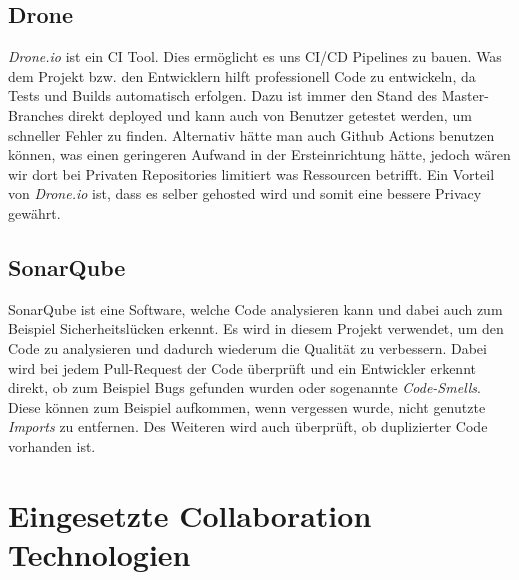 \subsection{Drone}
    \textit{Drone.io} ist ein \ac{CI} Tool. Dies ermöglicht es uns \ac{CI/CD} Pipelines zu bauen. Was dem Projekt bzw. den Entwicklern hilft professionell Code zu entwickeln, da Tests und Builds automatisch erfolgen.
    Dazu ist immer den Stand des Master-Branches direkt deployed und kann auch von Benutzer getestet werden, um schneller Fehler zu finden. Alternativ hätte man auch Github Actions benutzen können, was einen geringeren
    Aufwand in der Ersteinrichtung hätte, jedoch wären wir dort bei Privaten Repositories limitiert was Ressourcen betrifft. Ein Vorteil von \textit{Drone.io} ist, dass es selber gehosted wird und somit eine bessere Privacy gewährt.
\subsection{SonarQube}
    SonarQube ist eine Software, welche Code analysieren kann und dabei auch zum Beispiel Sicherheitslücken erkennt.
    Es wird in diesem Projekt verwendet, um den Code zu analysieren und dadurch wiederum die Qualität zu verbessern.
    Dabei wird bei jedem Pull-Request der Code überprüft und ein Entwickler erkennt direkt, ob zum Beispiel Bugs gefunden wurden oder sogenannte \textit{Code-Smells}. 
    Diese können zum Beispiel aufkommen, wenn vergessen wurde, nicht genutzte \textit{Imports} zu entfernen.
    Des Weiteren wird auch überprüft, ob duplizierter Code vorhanden ist.

\section{Eingesetzte Collaboration Technologien} 
